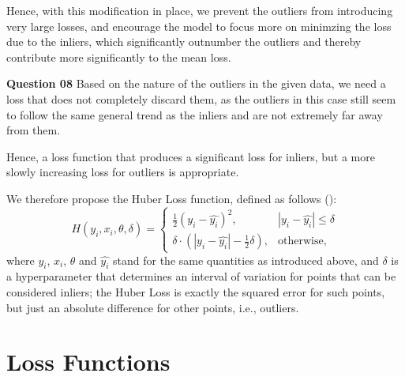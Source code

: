 \documentclass{article}[a4paper]
\begin{document}
	Hence, with this modification in place, we prevent the outliers from introducing very large losses, and encourage
	the model to focus more on minimzing the loss due to the inliers, which significantly outnumber the outliers and thereby contribute
	more significantly to the mean loss.
	\newline

	\textbf{Question 08} Based on the nature of the outliers in the given data, we need a loss that does not completely discard them, as
	the outliers in this case still seem to follow the same general trend as the inliers and are not extremely far away from them.
	\newline
	
	Hence, a loss function that produces a significant loss for inliers, but a more slowly increasing loss for outliers is appropriate.
	\newline

	We therefore propose the Huber Loss function, defined as follows (\cite{huberloss}): \[
		H\left( y_i, x_i, \theta, \delta \right) = \begin{cases}
			\frac{1}{2}\left(y_i - \hat{y_i}\right)^2,										& \left|y_i - \hat{y_i}\right| \leq \delta \\
			\delta \cdot \left( \left|y_i - \hat{y_i}\right| - \frac{1}{2}\delta \right),	& \text{otherwise},
		\end{cases}
	\] where $y_i$, $x_i$, $\theta$ and $\hat{y_i}$ stand for the same quantities as introduced above, and $\delta$ is a hyperparameter
	that determines an interval of variation for points that can be considered inliers; the Huber Loss is exactly the squared error
	for such points, but just an absolute difference for other points, i.e., outliers.

	\section{Loss Functions}
\end{document}
